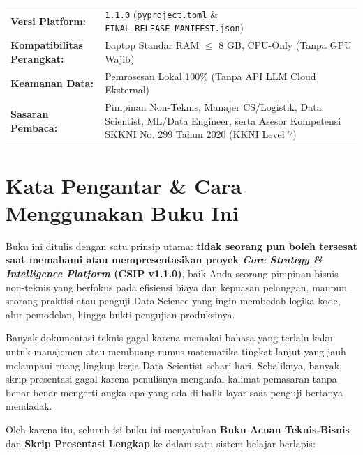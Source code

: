 \documentclass[11pt,a4paper,oneside]{book}
\newcommand{\code}[1]{{\small\nolinkurl{#1}}}
\begin{document}
\begin{titlepage}
\vfill
\begin{tcolorbox}[colback=csipLightBg, colframe=csipTeal, left=12pt, right=12pt, top=10pt, bottom=10pt]
\normalsize
\begin{tabular}{@{}l p{10.6cm}@{}}
\textbf{Versi Platform:} & \code{1.1.0} (\code{pyproject.toml} \& \code{FINAL_RELEASE_MANIFEST.json}) \\
\textbf{Kompatibilitas Perangkat:} & Laptop Standar RAM $\le$ 8 GB, CPU-Only (Tanpa GPU Wajib) \\
\textbf{Keamanan Data:} & Pemrosesan Lokal 100\% (Tanpa API LLM Cloud Eksternal) \\
\textbf{Sasaran Pembaca:} & Pimpinan Non-Teknis, Manajer CS/Logistik, Data Scientist, ML/Data Engineer, serta Asesor Kompetensi SKKNI No. 299 Tahun 2020 (KKNI Level 7) \\
\end{tabular}
\end{tcolorbox}
\end{titlepage}

\chapter*{Kata Pengantar \& Cara Menggunakan Buku Ini}

Buku ini ditulis dengan satu prinsip utama: \textbf{tidak seorang pun boleh tersesat saat memahami atau mempresentasikan proyek \emph{Core Strategy \& Intelligence Platform} (CSIP v1.1.0)}, baik Anda seorang pimpinan bisnis non-teknis yang berfokus pada efisiensi biaya dan kepuasan pelanggan, maupun seorang praktisi atau penguji Data Science yang ingin membedah logika kode, alur pemodelan, hingga bukti pengujian produksinya.

Banyak dokumentasi teknis gagal karena memakai bahasa yang terlalu kaku untuk manajemen atau membuang rumus matematika tingkat lanjut yang jauh melampaui ruang lingkup kerja Data Scientist sehari-hari. Sebaliknya, banyak skrip presentasi gagal karena penulisnya menghafal kalimat pemasaran tanpa benar-benar mengerti angka apa yang ada di balik layar saat penguji bertanya mendadak.

Oleh karena itu, seluruh isi buku ini menyatukan \textbf{Buku Acuan Teknis-Bisnis} dan \textbf{Skrip Presentasi Lengkap} ke dalam satu sistem belajar berlapis:
\end{document}
